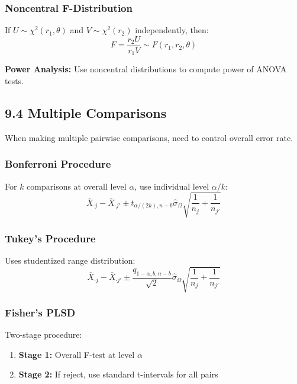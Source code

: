 \subsubsection{Noncentral F-Distribution}

If $U \sim \chi^2(r_1, \theta)$ and $V \sim \chi^2(r_2)$ independently, then:
\[
F = \frac{r_2 U}{r_1 V} \sim F(r_1, r_2, \theta)
\]

\textbf{Power Analysis:} Use noncentral distributions to compute power of ANOVA tests.

\subsection{9.4 Multiple Comparisons}

When making multiple pairwise comparisons, need to control overall error rate.

\subsubsection{Bonferroni Procedure}

\begin{definition}
For $k$ comparisons at overall level $\alpha$, use individual level $\alpha/k$:
\[
\bar{X}_{\cdot j} - \bar{X}_{\cdot j'} \pm t_{\alpha/(2k), n-b} \hat{\sigma}_\Omega \sqrt{\frac{1}{n_j} + \frac{1}{n_{j'}}}
\]
\end{definition}
\subsubsection{Tukey's Procedure}

\begin{definition}
Uses studentized range distribution:
\[
\bar{X}_{\cdot j} - \bar{X}_{\cdot j'} \pm \frac{q_{1-\alpha,b,n-b}}{\sqrt{2}} \hat{\sigma}_\Omega \sqrt{\frac{1}{n_j} + \frac{1}{n_{j'}}}
\]
\end{definition}
\subsubsection{Fisher's PLSD}

Two-stage procedure:

\begin{enumerate}
	\item \textbf{Stage 1:} Overall F-test at level $\alpha$
	\item \textbf{Stage 2:} If reject, use standard t-intervals for all pairs
\end{enumerate}

